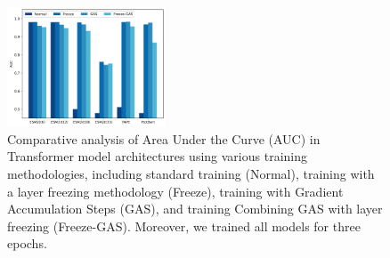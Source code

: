 \begin{figure}[h]
	\centering
	
	\includegraphics[width=0.42\textwidth]{../img/results/metrics_comparion_by_model}	
	
	\caption{Comparative analysis of Area Under the Curve (AUC) in Transformer model architectures using various training methodologies, including standard training (Normal), training with a layer freezing methodology (Freeze), training with Gradient Accumulation Steps (GAS), and training Combining GAS with layer freezing (Freeze-GAS). Moreover, we trained all models for three epochs.}
	\label{fig:comparison_3_3pochs}
\end{figure}



